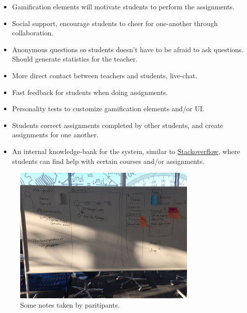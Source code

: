 \begin{itemize}
    \item Gamification elements will motivate students to perform the assignments.
    \item Social support, encourage students to cheer for one-another through collaboration.
    \item Anonymous questions so students doesn't have to be afraid to ask questions. Should generate statistics for the teacher.
    \item More direct contact between teachers and students, live-chat.
    \item Fast feedback for students when doing assignments. 
    \item Personality tests to customize gamification elements and/or UI.
    \item Students correct assignments completed by other students, and create assignments for one another.
    \item An internal knowledge-bank for the system, similar to \href{https://stackoverflow.com/}{Stackoverflow}, where students can find help with certain courses and/or assignments.
\end{itemize}

\begin{figure}[H]
\centering
\includegraphics[width=0.8\textwidth]{img/Grupp2_Workshop_mockup.jpg}
\caption{Some notes taken by paritipants.}
\label{fig:workshop4}
\end{figure}
